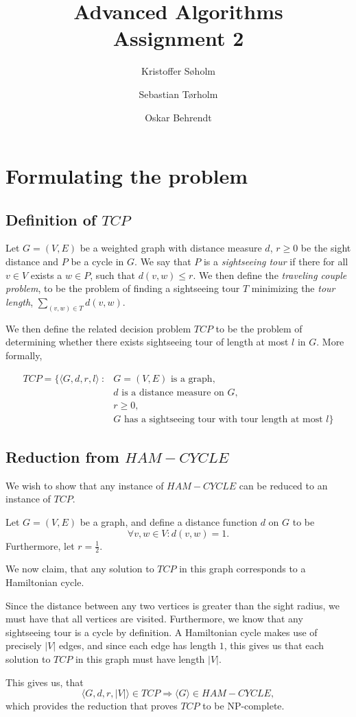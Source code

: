 \documentclass[11pt,a4paper]{article}
\title{Advanced Algorithms\\Assignment 2}
\author{Kristoffer Søholm \and Sebastian Tørholm \and Oskar Behrendt}
\begin{document}
\maketitle

\section{Formulating the problem}
\subsection{Definition of $TCP$}
Let $G = (V, E)$ be a weighted graph with distance measure $d$,
$r \geq 0$ be the sight distance and $P$ be a cycle in $G$. We say
that $P$ is a \emph{sightseeing tour} if there for all $v \in V$ exists a
$w \in P$, such that $d(v, w) \leq r$. We then define the \emph{traveling
couple problem}, to be the problem of finding a sightseeing tour $T$ minimizing
the \emph{tour length}, $\sum_{(v,w) \in T} d(v, w)$.

We then define the related decision problem $TCP$ to be the problem of determining
whether there exists sightseeing tour of length at most $l$ in $G$. More formally,

\begin{align}
    TCP = \{ \langle G, d, r, l \rangle\ :& G = (V,E) \text{ is a graph}, \\
                                          & d \text{ is a distance measure on } G, \\
                                          & r \geq 0, \\
                                          & G \text{ has a sightseeing tour with tour length at most } l \}
\end{align}

\subsection{Reduction from $HAM-CYCLE$}
We wish to show that any instance of $HAM-CYCLE$ can be reduced to an instance of $TCP$.

Let $G = (V, E)$ be a graph, and define a distance function $d$ on $G$ to be
\[
    \forall v, w \in V : d(v, w) = 1.
\]
Furthermore, let $r = \frac{1}{2}$.

We now claim, that any solution to $TCP$ in this graph corresponds to a Hamiltonian cycle.

Since the distance between any two vertices is greater than the sight radius, we must have that
all vertices are visited. Furthermore, we know that any sightseeing tour is a cycle by definition.
A Hamiltonian cycle makes use of precisely $|V|$ edges, and since each edge has length $1$, this gives
us that each solution to $TCP$ in this graph must have length $|V|$.

This gives us, that
\[
    \langle G, d, r, |V| \rangle \in TCP \Rightarrow \langle G \rangle \in HAM-CYCLE,
\]
which provides the reduction that proves $TCP$ to be NP-complete.



\end{document}
